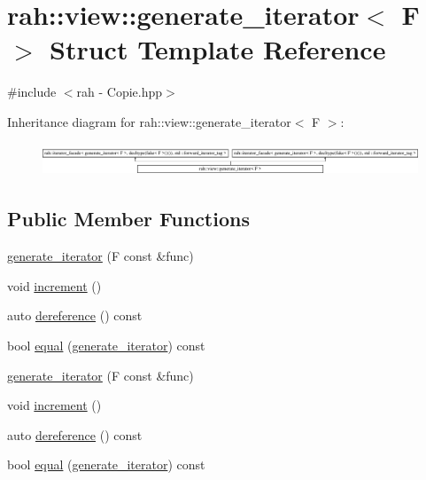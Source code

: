 \hypertarget{structrah_1_1view_1_1generate__iterator}{}\section{rah\+::view\+::generate\+\_\+iterator$<$ F $>$ Struct Template Reference}
\label{structrah_1_1view_1_1generate__iterator}


{\ttfamily \#include $<$rah -\/ Copie.\+hpp$>$}

Inheritance diagram for rah\+::view\+::generate\+\_\+iterator$<$ F $>$\+:\begin{figure}[H]
\begin{center}
\leavevmode
\includegraphics[height=0.979021cm]{structrah_1_1view_1_1generate__iterator}
\end{center}
\end{figure}
\subsection*{Public Member Functions}
\begin{DoxyCompactItemize}
\item 
\mbox{\hyperlink{structrah_1_1view_1_1generate__iterator_a407696209d96fe38234970a91d23e35f}{generate\+\_\+iterator}} (F const \&func)
\item 
void \mbox{\hyperlink{structrah_1_1view_1_1generate__iterator_aeb0fc0db74bda811fe5d7cb8c6efe1e0}{increment}} ()
\item 
auto \mbox{\hyperlink{structrah_1_1view_1_1generate__iterator_ab7b0cf4a8f45cfd67278935bd9a39c13}{dereference}} () const
\item 
bool \mbox{\hyperlink{structrah_1_1view_1_1generate__iterator_acd6b1f8f7d75f1106a6046b3baee4796}{equal}} (\mbox{\hyperlink{structrah_1_1view_1_1generate__iterator}{generate\+\_\+iterator}}) const
\item 
\mbox{\hyperlink{structrah_1_1view_1_1generate__iterator_a407696209d96fe38234970a91d23e35f}{generate\+\_\+iterator}} (F const \&func)
\item 
void \mbox{\hyperlink{structrah_1_1view_1_1generate__iterator_aeb0fc0db74bda811fe5d7cb8c6efe1e0}{increment}} ()
\item 
auto \mbox{\hyperlink{structrah_1_1view_1_1generate__iterator_ab7b0cf4a8f45cfd67278935bd9a39c13}{dereference}} () const
\item 
bool \mbox{\hyperlink{structrah_1_1view_1_1generate__iterator_acd6b1f8f7d75f1106a6046b3baee4796}{equal}} (\mbox{\hyperlink{structrah_1_1view_1_1generate__iterator}{generate\+\_\+iterator}}) const
\end{DoxyCompactItemize}

